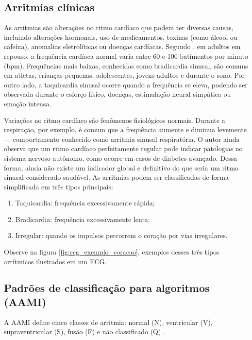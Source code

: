\subsection{Arritmias clínicas}

As arritmias são alterações no ritmo cardíaco que podem ter diversas causas, incluindo alterações hormonais, uso de medicamentos, toxinas (como álcool ou cafeína), anomalias eletrolíticas ou doenças cardíacas.
Segundo , em adultos em repouso, a frequência cardíaca normal varia entre 60 e 100 batimentos por minuto (bpm). Frequências mais baixas, conhecidas como bradicardia sinusal, são comuns em atletas, crianças pequenas, adolescentes, jovens adultos e durante o sono. Por outro lado, a taquicardia sinusal ocorre quando a frequência se eleva, podendo ser observada durante o esforço físico, doenças, estimulação neural simpática ou emoção intensa.

Variações no ritmo cardíaco são fenômenos fisiológicos normais. Durante a respiração, por exemplo, é comum que a frequência aumente e diminua levemente — comportamento conhecido como arritmia sinusal respiratória. O autor ainda observa que um ritmo cardíaco perfeitamente regular pode indicar patologias no sistema nervoso autônomo, como ocorre em casos de diabetes avançado. Dessa forma, ainda não existe um indicador global e definitivo do que seria um ritmo sinusal considerado saudável.
As arritmias podem ser classificadas de forma simplificada em três tipos principais:

\begin{enumerate}
    \item Taquicardia: frequência excessivamente rápida;
    \item Bradicardia: frequência excessivamente lenta;
    \item Irregular: quando os impulsos percorrem o coração por vias irregulares.
\end{enumerate}

Observe na figura \ref{fig:ecg_exemplo_coracao}, exemplos desses três tipos arrítmicos ilustrados em um ECG.

\subsection{Padrões de classificação para algoritmos (AAMI)}

A AAMI define cinco classes de arritmia: normal (N), ventricular (V), supraventricular (S), fusão (F) e não classificado (Q) \cite{silva2025,saadatnejad2020}.

